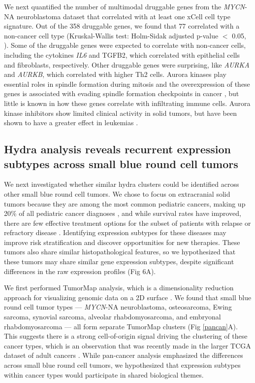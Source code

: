 \documentclass[10pt,letterpaper]{article}
\begin{document}
We next quantified the number of multimodal druggable genes from the \textit{MYCN}-NA neuroblastoma dataset that correlated with at least one xCell cell type signature. Out of the 358 druggable genes, we found that 77 correlated with a non-cancer cell type (Kruskal-Wallis test: Holm-Sidak adjusted p-value $<$ 0.05, ). Some of the druggable genes were expected to correlate with non-cancer cells, including the cytokines \textit{IL6} and TGFB2, which correlated with epithelial cells and fibroblasts, respectively. Other druggable genes were surprising, like \textit{AURKA} and \textit{AURKB}, which correlated with higher Th2 cells. Aurora kinases play essential roles in spindle formation during mitosis and the overexpression of these genes is associated with evading spindle formation checkpoints in cancer \cite{marisInitialTestingAurora2010}, but little is known in how these genes correlate with infiltrating immune cells. Aurora kinase inhibitors show limited clinical activity in solid tumors, but have been shown to have a greater effect in leukemias \cite{marisInitialTestingAurora2010,gautschiAuroraKinasesAnticancer2008}.

\subsection*{Hydra analysis reveals recurrent expression subtypes across small blue round cell tumors}
We next investigated whether similar hydra clusters could be identified across other small blue round cell tumors. We chose to focus on extracranial solid tumors because they are among the most common pediatric cancers, making up 20\% of all pediatric cancer diagnoses \cite{riesCancerIncidenceSurvival1999}, and while survival rates have improved, there are few effective treatment options for the subset of patients with relapse or refractory disease \cite{ringCheckpointProteinsPediatric2017}. Identifying expression subtypes for these diseases may improve risk stratification and discover opportunities for new therapies. These tumors also share similar histopathological features, so we hypothesized that these tumors may share similar gene expression subtypes, despite significant differences in the raw expression profiles (Fig 6A).  

We first performed TumorMap analysis, which is a dimensionality reduction approach for visualizing genomic data on a 2D surface \cite{newtonTumorMapExploringMolecular2017}. We found that small blue round cell tumor types --- \textit{MYCN}-NA neuroblastoma, osteosarcoma, Ewing sarcoma, synovial sarcoma, alveolar rhabdomyosarcoma, and embryonal rhabdomyosarcoma --- all form separate TumorMap clusters (Fig \ref{pancan}A). This suggests there is a strong cell-of-origin signal driving the clustering of these cancer types, which is an observation that was recently made in the larger TCGA dataset of adult cancers \cite{hoadleyCellofOriginPatternsDominate2018}. While pan-cancer analysis emphasized the differences across small blue round cell tumors, we hypothesized that expression subtypes within cancer types would participate in shared biological themes.
\end{document}
